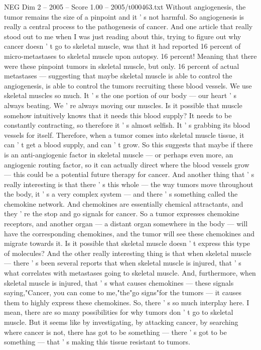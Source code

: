 \begin{textsample}{NEG Dim 2 – 2005 – Score 1.00 – 2005/t000463.txt}
Without angiogenesis, the tumor remains the size of a pinpoint and it ' s not harmful.
So angiogenesis is really a central process to the pathogenesis of cancer.
And one article that really stood out to me when I was just reading about this, trying to figure out why cancer doesn ' t go to skeletal muscle, was that it had reported 16 percent of micro-metastases to skeletal muscle upon autopsy. 16 percent!
Meaning that there were these pinpoint tumors in skeletal muscle, but only. 16 percent of actual metastases — suggesting that maybe skeletal muscle is able to control the angiogenesis, is able to control the tumors recruiting these blood vessels.
We use skeletal muscles so much.
It ' s the one portion of our body — our heart ' s always beating.
We ' re always moving our muscles.
Is it possible that muscle somehow intuitively knows that it needs this blood supply?
It needs to be constantly contracting, so therefore it ' s almost selfish.
It ' s grabbing its blood vessels for itself.
Therefore, when a tumor comes into skeletal muscle tissue, it can ' t get a blood supply, and can ' t grow.
So this suggests that maybe if there is an anti-angiogenic factor in skeletal muscle — or perhaps even more, an angiogenic routing factor, so it can actually direct where the blood vessels grow — this could be a potential future therapy for cancer.
And another thing that ' s really interesting is that there ' s this whole — the way tumors move throughout the body, it ' s a very complex system — and there ' s something called the chemokine network.
And chemokines are essentially chemical attractants, and they ' re the stop and go signals for cancer.
So a tumor expresses chemokine receptors, and another organ — a distant organ somewhere in the body — will have the corresponding chemokines, and the tumor will see these chemokines and migrate towards it.
Is it possible that skeletal muscle doesn ' t express this type of molecules?
And the other really interesting thing is that when skeletal muscle — there ' s been several reports that when skeletal muscle is injured, that ' s what correlates with metastases going to skeletal muscle.
And, furthermore, when skeletal muscle is injured, that ' s what causes chemokines — these signals saying,"Cancer, you can come to me,"the"go signs"for the tumors — it causes them to highly express these chemokines.
So, there ' s so much interplay here.
I mean, there are so many possibilities for why tumors don ' t go to skeletal muscle.
But it seems like by investigating, by attacking cancer, by searching where cancer is not, there has got to be something — there ' s got to be something — that ' s making this tissue resistant to tumors.

\end{textsample}
